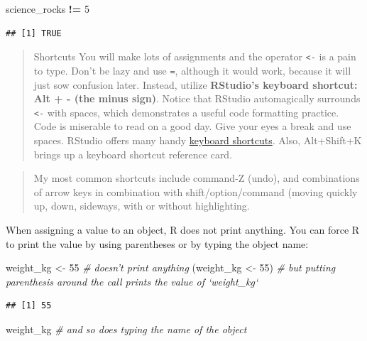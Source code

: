 \documentclass[]{book}
\newenvironment{Shaded}{\begin{snugshade}}{\end{snugshade}}
\newcommand{\DecValTok}[1]{\textcolor[rgb]{0.00,0.00,0.81}{#1}}
\newcommand{\StringTok}[1]{\textcolor[rgb]{0.31,0.60,0.02}{#1}}
\newcommand{\CommentTok}[1]{\textcolor[rgb]{0.56,0.35,0.01}{\textit{#1}}}
\newcommand{\OperatorTok}[1]{\textcolor[rgb]{0.81,0.36,0.00}{\textbf{#1}}}
\newcommand{\NormalTok}[1]{#1}
\theoremstyle{definition}
\theoremstyle{definition}
\theoremstyle{definition}
\theoremstyle{remark}
\begin{document}
\begin{Shaded}
\begin{Highlighting}[]
\NormalTok{science_rocks }\OperatorTok{!=}\StringTok{ }\DecValTok{5}
\end{Highlighting}
\end{Shaded}

\begin{verbatim}
## [1] TRUE
\end{verbatim}

\begin{quote}
Shortcuts You will make lots of assignments and the operator
\texttt{\textless{}-} is a pain to type. Don't be lazy and use
\texttt{=}, although it would work, because it will just sow confusion
later. Instead, utilize \textbf{RStudio's keyboard shortcut: Alt + -
(the minus sign)}. Notice that RStudio automagically surrounds
\texttt{\textless{}-} with spaces, which demonstrates a useful code
formatting practice. Code is miserable to read on a good day. Give your
eyes a break and use spaces. RStudio offers many handy
\href{https://support.rstudio.com/hc/en-us/articles/200711853-Keyboard-Shortcuts}{keyboard
shortcuts}. Also, Alt+Shift+K brings up a keyboard shortcut reference
card.
\end{quote}

\begin{quote}
My most common shortcuts include command-Z (undo), and combinations of
arrow keys in combination with shift/option/command (moving quickly up,
down, sideways, with or without highlighting.
\end{quote}

When assigning a value to an object, R does not print anything. You can
force R to print the value by using parentheses or by typing the object
name:

\begin{Shaded}
\begin{Highlighting}[]
\NormalTok{weight_kg <-}\StringTok{ }\DecValTok{55}    \CommentTok{# doesn't print anything}
\NormalTok{(weight_kg <-}\StringTok{ }\DecValTok{55}\NormalTok{)  }\CommentTok{# but putting parenthesis around the call prints the value of `weight_kg`}
\end{Highlighting}
\end{Shaded}

\begin{verbatim}
## [1] 55
\end{verbatim}

\begin{Shaded}
\begin{Highlighting}[]
\NormalTok{weight_kg          }\CommentTok{# and so does typing the name of the object}
\end{Highlighting}
\end{Shaded}
\end{document}
